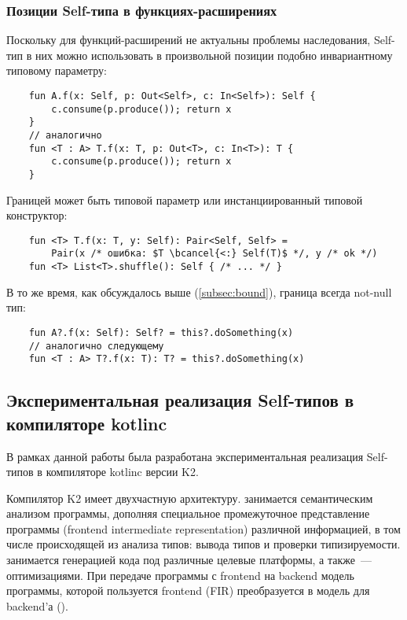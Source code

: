 \subsubsection{Позиции Self-типа в функциях-расширениях} \label{subsubsec:extension-position}

Поскольку для функций-расширений не актуальны проблемы наследования, Self-тип в них можно использовать в произвольной позиции подобно инвариантному типовому параметру:

\begin{verbatim}
    fun A.f(x: Self, p: Out<Self>, c: In<Self>): Self {
        c.consume(p.produce()); return x
    }
    // аналогично
    fun <T : A> T.f(x: T, p: Out<T>, c: In<T>): T {
        c.consume(p.produce()); return x
    }
\end{verbatim}

Границей может быть типовой параметр или инстанциированный типовой конструктор:

\begin{verbatim}
    fun <T> T.f(x: T, y: Self): Pair<Self, Self> =
        Pair(x /* ошибка: $T \bcancel{<:} Self(T)$ */, y /* ok */)
    fun <T> List<T>.shuffle(): Self { /* ... */ }
\end{verbatim}

В то же время, как обсуждалось выше (\ref{subsec:bound}), граница всегда not-null тип:

\begin{verbatim}
    fun A?.f(x: Self): Self? = this?.doSomething(x)
    // аналогично следующему
    fun <T : A> T?.f(x: T): T? = this?.doSomething(x)
\end{verbatim}


\subsection{Экспериментальная реализация Self-типов в компиляторе kotlinc}

В рамках данной работы была разработана экспериментальная реализация Self-типов в компиляторе kotlinc версии K2.

Компилятор K2 имеет двухчастную архитектуру.
 занимается семантическим анализом программы, дополняя специальное промежуточное представление программы  (frontend intermediate representation) различной информацией, в том числе происходящей из анализа типов: вывода типов и проверки типизируемости.
 занимается генерацией кода под различные целевые платформы, а также~--- оптимизациями.
При передаче программы с frontend на backend модель программы, которой пользуется frontend (FIR) преобразуется в модель для backend'а ().

